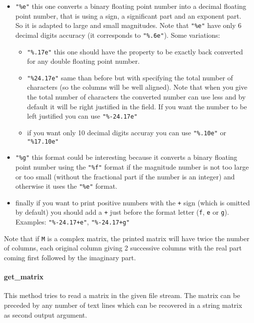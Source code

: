 \begin{itemize}
\begin{itemize}
\item \verb+"%e"+ this one converts a binary floating point number into a decimal
floating point number, that is using a sign, a significant part and an exponent
part. So it is adapted to large and small magnitudes. Note that  \verb+"%e"+ have 
only 6 decimal digits accuracy (it corresponds to  \verb+"%.6e"+). Some variations: 
\begin{itemize}
\item \verb+"%.17e"+ this one should have the property to be exactly back converted 
for any double floating point number.
\item \verb+"%24.17e"+ same than before but with specifying the total number of characters
(so the columns will be well aligned). Note that when you give the total number of 
characters the converted number can use less and by default it will be right justified 
in the field. If you want the number to be left justified you can use  \verb+"%-24.17e"+
\item if you want only 10 decimal digits accuray you can use  \verb+"%.10e"+ or
\verb+"%17.10e"+
\end{itemize}
\item  \verb+"%g"+ this format could be interesting because it converts a binary
floating point number using the \verb+"%f"+ format if the magnitude number is not too
large or too small (without the fractional part if the number is an integer) and 
otherwise it uses the \verb+"%e"+ format.

\item finally if you want to print positive numbers with the \verb-+- sign (which is
omitted by default) you should add a  \verb-+- just before the format letter (\verb+f+,
\verb+e+ or \verb+g+). Examples: \verb/"%-24.17+e"/, \verb/"%-24.17+g"/
\end{itemize}
\end{itemize}

Note that  if \verb+M+ is a complex matrix, the printed matrix will have twice the number
of columns, each original column giving 2 successive columns with the real part coming first
followed by the imaginary part.


\paragraph{get\_matrix}

This method tries to read a matrix in the given file stream. The matrix can be preceded by
any number of text lines which can be recovered in a string matrix as second output argument.

